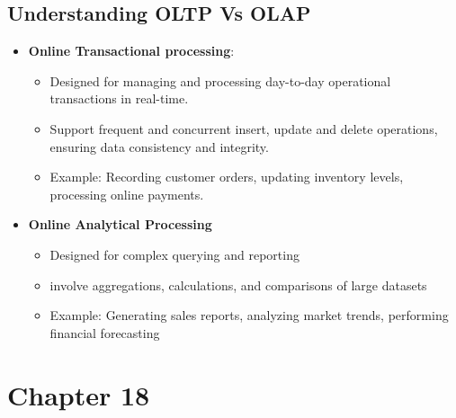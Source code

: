\documentclass{report}
\begin{document}
\subsection{Understanding OLTP Vs OLAP}
\begin{itemize}
    \item \textbf{Online Transactional processing}:
        \begin{itemize}[label=$\circ$]
        
            \item Designed for managing and processing day-to-day operational transactions in real-time.
            \item Support frequent and concurrent insert, update and delete operations, ensuring data consistency and integrity.
            \item Example: Recording customer orders, updating inventory levels, processing online payments.
        \end{itemize}
        \item \textbf{Online Analytical Processing}
            \begin{itemize}[label=$\circ$]
                \item Designed for complex querying and reporting
                \item involve aggregations, calculations, and comparisons of large datasets
                \item Example: Generating sales reports, analyzing market trends, performing financial forecasting
            \end{itemize}
\end{itemize}
\section{Chapter 18}
\end{document}
